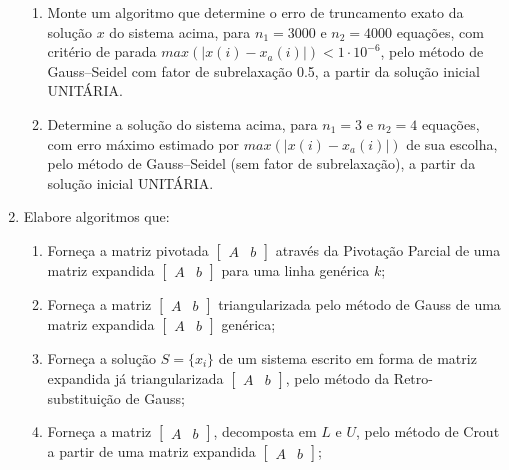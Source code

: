 \documentclass[12pt]{article}
\newenvironment{smallitem}{
    \vspace{-2mm}
    \begin{enumerate}
    \setlength{\parskip}{0pt}
    \setlength{\itemsep}{2pt}
}{
    \vspace{-2mm}
    \end{enumerate}
}
\begin{document}
\begin{enumerate}[label=\textbf{\arabic*})]
\begin{smallitem}
\item Monte um algoritmo que determine o erro de truncamento exato da solução
$x$ do sistema acima, para $n_1 = 3000$ e $n_2 = 4000$ equações, com critério de
parada $max(\vert x(i) - x_a(i) \vert) < 1 \cdot 10^{-6}$, pelo método de
Gauss--Seidel com fator de subrelaxação 0.5, a partir da solução inicial
UNITÁRIA.

\item Determine a solução do sistema acima, para $n_1 = 3$ e $n_2 = 4$ equações,
com erro máximo estimado por $max(\vert x(i) - x_a(i) \vert)$ de sua escolha,
pelo método de Gauss--Seidel (sem fator de subrelaxação), a partir da solução
inicial UNITÁRIA.

\end{smallitem}

\item Elabore algoritmos que:

\begin{smallitem}

\item Forneça a matriz pivotada $\begin{bmatrix} A & b \end{bmatrix}$ através da
Pivotação Parcial de uma matriz expandida $\begin{bmatrix} A & b \end{bmatrix}$
para uma linha genérica $k$;

\item Forneça a matriz $\begin{bmatrix} A & b \end{bmatrix}$ triangularizada
pelo método de Gauss de uma matriz expandida $\begin{bmatrix} A & b
\end{bmatrix}$ genérica;

\item Forneça a solução $S = \{x_i\}$ de um sistema escrito em forma de matriz
expandida já triangularizada $\begin{bmatrix} A & b \end{bmatrix}$, pelo método
da Retro-substituição de Gauss;

\item Forneça a matriz $\begin{bmatrix} A & b \end{bmatrix}$, decomposta em $L$
e $U$, pelo método de Crout a partir de uma matriz expandida $\begin{bmatrix} A
& b \end{bmatrix}$;


\end{smallitem}
\end{enumerate}
\end{document}
